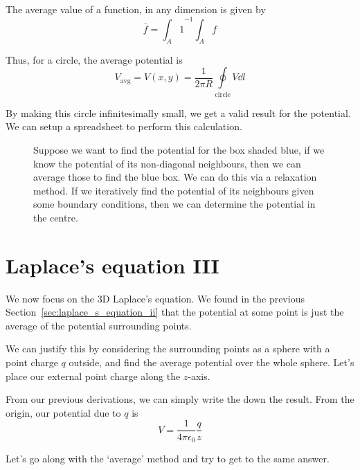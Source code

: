 \documentclass[12pt,chapterprefix=false,dvipsnames]{scrbook}
\theoremstyle{dotless}
\theoremstyle{definition}
\begin{document}
The average value of a function, in any dimension is given by
\begin{equation}
	\label{eq:average_value_of_a_function}
	\bar{f} = {\int_A 1}^{-1}\int_A f
\end{equation}

Thus, for a circle, the average potential is
\begin{equation}
	\label{eq:2d_laplacian_numerical}
	V_{\mathrm{avg}} = V(x,y) =
	\frac{1}{2\pi R}\oint\limits_{\mathrm{circle}} V
	\dd{l}
\end{equation}

By making this circle infinitesimally small, we get a valid
result for the potential. We can setup a spreadsheet to perform
this calculation.

\begin{figure}[htpb]
	\centering
	
	\caption{Suppose we want to find the potential for the box shaded
		blue, if we know the potential of its non-diagonal
		neighbours, then we can average those to find the blue box. We can do this
		via a relaxation method. If we iteratively find the potential of
		its neighbours given some boundary conditions, then we can determine the potential in the centre.}%
	\label{fig:2d_laplacian}%
\end{figure}

\section{Laplace's equation III}%
\label{sec:laplace_s_equation_iii}%

We now focus on the 3D Laplace's equation. We found in the
previous Section~\ref{sec:laplace_s_equation_ii} that the potential at
some point is just the average of the potential surrounding
points.

We can justify this by considering the surrounding points as a
sphere with a point charge $q$ outside, and
find the average potential over the whole sphere. Let's place
our external point charge along the
$z$-axis.

From our previous derivations, we can simply write the down the
result. From the origin, our potential due to
$q$ is
\begin{equation}
	V = \frac{1}{4\pi\epsilon_{0}}\frac{q}{z}
\end{equation}

Let's go along with the `average' method and try to get to the
same answer.
\end{document}
